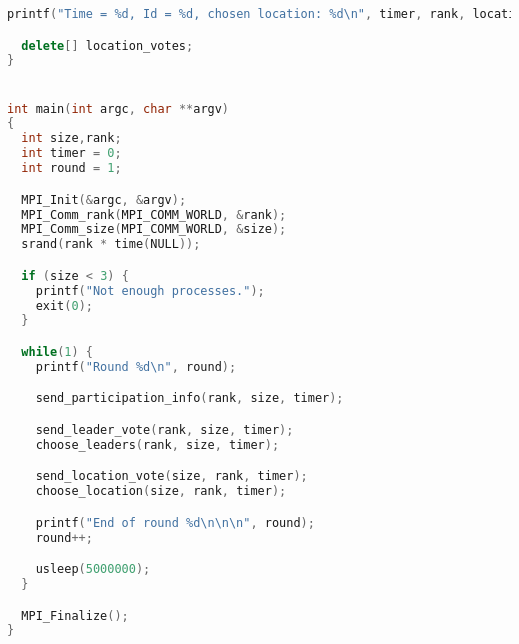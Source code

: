 \documentclass{article}
\begin{document}
\begin{lstlisting}[language=C++, caption=Message Passing Interface C++ Code, label=lst:code]
  printf("Time = %d, Id = %d, chosen location: %d\n", timer, rank, location);

  delete[] location_votes;
}


int main(int argc, char **argv)
{
  int size,rank;
  int timer = 0;
  int round = 1;

  MPI_Init(&argc, &argv);
  MPI_Comm_rank(MPI_COMM_WORLD, &rank);
  MPI_Comm_size(MPI_COMM_WORLD, &size);
  srand(rank * time(NULL));

  if (size < 3) {
    printf("Not enough processes.");
    exit(0);
  }

  while(1) {
    printf("Round %d\n", round);

    send_participation_info(rank, size, timer);

    send_leader_vote(rank, size, timer);
    choose_leaders(rank, size, timer);

    send_location_vote(size, rank, timer);
    choose_location(size, rank, timer);

    printf("End of round %d\n\n\n", round);
    round++;

    usleep(5000000);
  }

  MPI_Finalize();
}
\end{lstlisting}
\end{document}
